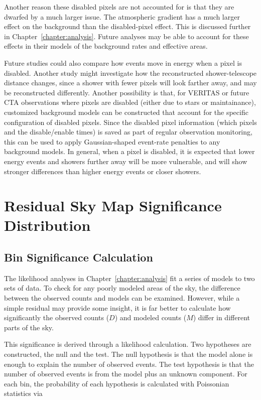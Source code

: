 Another reason these disabled pixels are not accounted for is that they are dwarfed by a much larger issue.
The atmospheric gradient has a much larger effect on the background than the disabled-pixel effect.
This is discussed further in Chapter~\ref{chapter:analysis}.
Future analyses may be able to account for these effects in their models of the background rates and effective areas.

Future studies could also compare how events move in energy when a pixel is disabled.
Another study might investigate how the reconstructed shower-telescope distance changes, since a shower with fewer pixels will look farther away, and may be reconstructed differently.
Another possibility is that, for VERITAS or future CTA observations where pixels are disabled (either due to stars or maintainance), customized background models can be constructed that account for the specific configuration of disabled pixels.
Since the disabled pixel information (which pixels and the disable/enable times) is saved as part of regular observation monitoring, this can be used to apply Gaussian-shaped event-rate penalties to any background models.
In general, when a pixel is disabled, it is expected that lower energy events and showers further away will be more vulnerable, and will show stronger differences than higher energy events or closer showers.



\chapter{Residual Sky Map Significance Distribution}\label{app:sigdist}

\section{Bin Significance Calculation}
The likelihood analyses in Chapter~\ref{chapter:analysis} fit a series of models to two sets of data.
To check for any poorly modeled areas of the sky, the difference between the observed counts and models can be examined.
However, while a simple residual may provide some insight, it is far better to calculate how significantly the observed counts ($D$) and modeled counts ($M$) differ in different parts of the sky.

This significance is derived through a likelihood calculation.
Two hypotheses are constructed, the null and the test.
The null hypothesis is that the model alone is enough to explain the number of observed events.
The test hypothesis is that the number of observed events is from the model plus an unknown component.
For each bin, the probability of each hypothesis is calculated with Poissonian statistics via

